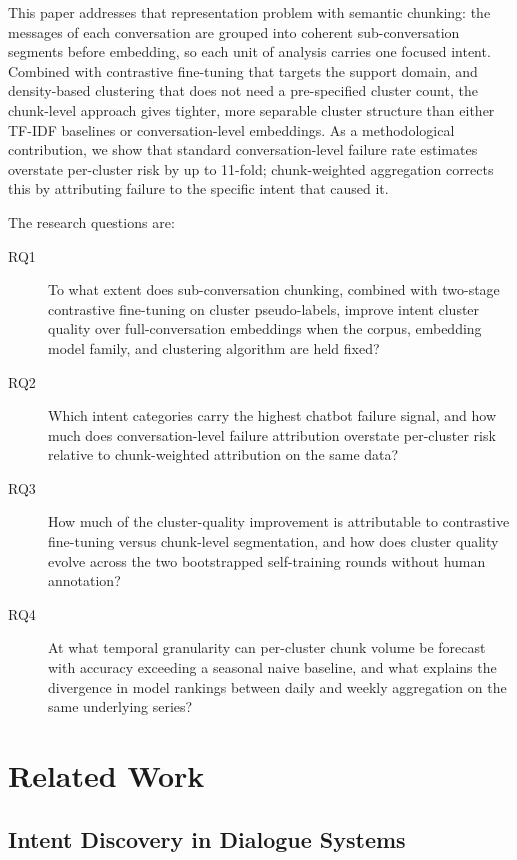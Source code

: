 \documentclass[conference]{IEEEtran}
\begin{document}
This paper addresses that representation problem with semantic chunking: the messages of each conversation are grouped into coherent sub-conversation segments before embedding, so each unit of analysis carries one focused intent. Combined with contrastive fine-tuning that targets the support domain, and density-based clustering that does not need a pre-specified cluster count, the chunk-level approach gives tighter, more separable cluster structure than either TF-IDF baselines or conversation-level embeddings. As a methodological contribution, we show that standard conversation-level failure rate estimates overstate per-cluster risk by up to 11-fold; chunk-weighted aggregation corrects this by attributing failure to the specific intent that caused it.

The research questions are:

\begin{description}
  \item[RQ1] To what extent does sub-conversation chunking, combined with two-stage contrastive fine-tuning on cluster pseudo-labels, improve intent cluster quality over full-conversation embeddings when the corpus, embedding model family, and clustering algorithm are held fixed?
  \item[RQ2] Which intent categories carry the highest chatbot failure signal, and how much does conversation-level failure attribution overstate per-cluster risk relative to chunk-weighted attribution on the same data?
  \item[RQ3] How much of the cluster-quality improvement is attributable to contrastive fine-tuning versus chunk-level segmentation, and how does cluster quality evolve across the two bootstrapped self-training rounds without human annotation?
  \item[RQ4] At what temporal granularity can per-cluster chunk volume be forecast with accuracy exceeding a seasonal naive baseline, and what explains the divergence in model rankings between daily and weekly aggregation on the same underlying series?
\end{description}

\section{Related Work}

\subsection{Intent Discovery in Dialogue Systems}
\end{document}
